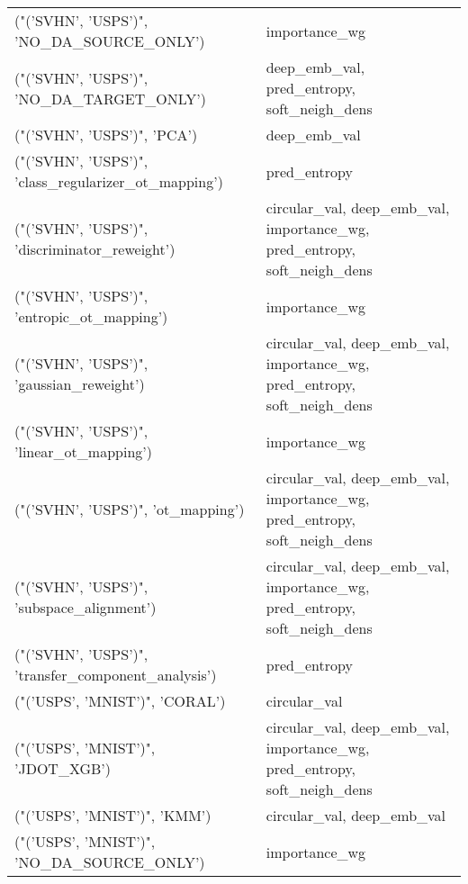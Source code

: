\begin{tabular}{ll}
 ("('SVHN', 'USPS')", 'NO\_DA\_SOURCE\_ONLY')             & importance\_wg                                                            \\
 ("('SVHN', 'USPS')", 'NO\_DA\_TARGET\_ONLY')             & deep\_emb\_val, pred\_entropy, soft\_neigh\_dens                              \\
 ("('SVHN', 'USPS')", 'PCA')                           & deep\_emb\_val                                                             \\
 ("('SVHN', 'USPS')", 'class\_regularizer\_ot\_mapping')  & pred\_entropy                                                             \\
 ("('SVHN', 'USPS')", 'discriminator\_reweight')        & circular\_val, deep\_emb\_val, importance\_wg, pred\_entropy, soft\_neigh\_dens \\
 ("('SVHN', 'USPS')", 'entropic\_ot\_mapping')           & importance\_wg                                                            \\
 ("('SVHN', 'USPS')", 'gaussian\_reweight')             & circular\_val, deep\_emb\_val, importance\_wg, pred\_entropy, soft\_neigh\_dens \\
 ("('SVHN', 'USPS')", 'linear\_ot\_mapping')             & importance\_wg                                                            \\
 ("('SVHN', 'USPS')", 'ot\_mapping')                    & circular\_val, deep\_emb\_val, importance\_wg, pred\_entropy, soft\_neigh\_dens \\
 ("('SVHN', 'USPS')", 'subspace\_alignment')            & circular\_val, deep\_emb\_val, importance\_wg, pred\_entropy, soft\_neigh\_dens \\
 ("('SVHN', 'USPS')", 'transfer\_component\_analysis')   & pred\_entropy                                                             \\
 ("('USPS', 'MNIST')", 'CORAL')                        & circular\_val                                                             \\
 ("('USPS', 'MNIST')", 'JDOT\_XGB')                     & circular\_val, deep\_emb\_val, importance\_wg, pred\_entropy, soft\_neigh\_dens \\
 ("('USPS', 'MNIST')", 'KMM')                          & circular\_val, deep\_emb\_val                                               \\
 ("('USPS', 'MNIST')", 'NO\_DA\_SOURCE\_ONLY')            & importance\_wg                                                            \\

\end{tabular}
